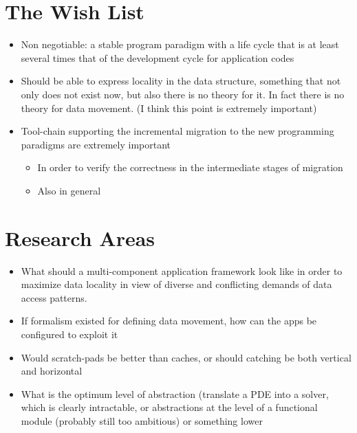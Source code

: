 \section{The Wish List}
\begin{itemize}
  \item Non negotiable: a stable program paradigm with a life cycle that is at least several times that of the development cycle for
   application codes
  \item Should be able to express locality in the data structure, something that not only does not exist now, but also there is no theory for
  it.
    In fact there is no theory for data movement.
    (I think this point is extremely important)
  \item Tool-chain supporting the incremental migration to the new programming paradigms are extremely important 
    \begin{itemize}
      \item In order to verify the correctness in the intermediate stages of migration
      \item Also in general
    \end{itemize}
\end{itemize}

\section{Research Areas}
\begin{itemize}
  \item What should a multi-component application framework look like in order to maximize data locality in view of diverse and conflicting
   demands of data access patterns.
  \item If formalism existed for defining data movement, how can the apps be configured to exploit it
  \item Would scratch-pads be better than caches, or should catching be both vertical and horizontal
  \item What is the optimum level of abstraction (translate a PDE into a solver, which is clearly intractable, or abstractions at the level of a functional module (probably still too ambitious) or something lower 
\end{itemize}
